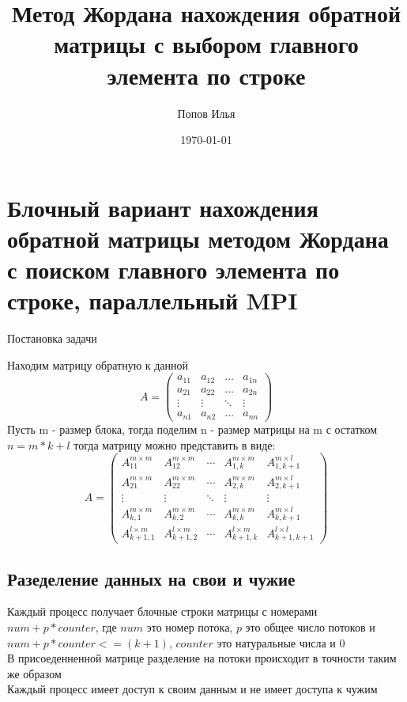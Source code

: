 \documentclass[a4paper,12pt]{article}
\begin{document}
\author{Попов Илья}


\title{Метод Жордана нахождения обратной матрицы с выбором главного элемента по строке}
\date{\today}
\maketitle

\section{Блочный вариант нахождения обратной матрицы методом Жордана с поиском 
главного элемента по строке, параллельный MPI}
\begin{center}
{Постановка задачи}
\end{center}

Находим матрицу обратную к данной
$$A=
   \begin{pmatrix}
     a_{11}& a_{12} &\ldots & a_{1n}\\
     a_{21}& a_{22} &\ldots & a_{2n}\\
     \vdots& \vdots &\ddots & \vdots\\
     a_{n1}& a_{n2} &\ldots & a_{nn}
    \end{pmatrix}
$$
Пусть m - размер блока, тогда поделим n - размер матрицы на m с остатком $n = m*k + l$ тогда матрицу
можно представить в виде:
$$A=
  \begin{pmatrix} 
    A_{11}^{m \times m} & A_{12}^{m \times m} & \cdots & A_{1,k}^{m \times m} & A_{1,k+1}^{m \times l} \\
    A_{21}^{m \times m} & A_{22}^{m \times m} & \cdots & A_{2,k}^{m \times m} & A_{2,k+1}^{m \times l} \\ 
    \vdots & \vdots & \ddots & \vdots & \vdots \\ 
    A_{k,1}^{m \times m} & A_{k,2}^{m \times m} & \cdots & A_{k,k}^{m \times m} & A_{k,k+1}^{m \times l} \\
    A_{k+1,1}^{l \times m} & A_{k+1,2}^{l \times m} & \cdots & A_{k+1,k}^{l \times m} & A_{k+1,k+1}^{l \times l} 
  \end{pmatrix}
$$

\subsection{Разеделение данных на свои и чужие}
Каждый процесс получает блочные строки матрицы с номерами $num + p * counter$, где $num$ это номер потока, 
$p$ это общее число потоков и $num + p * counter <= (k + 1)$, $counter$ это натуральные числа и 0\\
В присоеденненной матрице разделение на потоки происходит в точности таким же образом\\
Каждый процесс имеет доступ к своим данным и не имеет доступа к чужим\\
\end{document}
